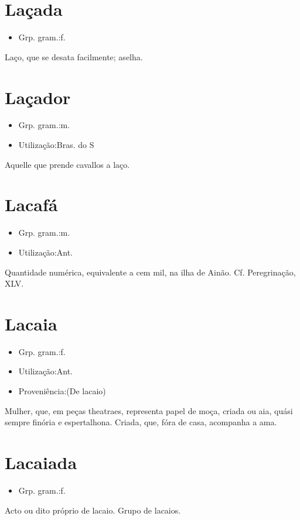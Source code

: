 \section{Laçada}
\begin{itemize}
\item {Grp. gram.:f.}
\end{itemize}
Laço, que se desata facilmente; aselha.
\section{Laçador}
\begin{itemize}
\item {Grp. gram.:m.}
\end{itemize}
\begin{itemize}
\item {Utilização:Bras. do S}
\end{itemize}
Aquelle que prende cavallos a laço.
\section{Lacafá}
\begin{itemize}
\item {Grp. gram.:m.}
\end{itemize}
\begin{itemize}
\item {Utilização:Ant.}
\end{itemize}
Quantidade numérica, equivalente a cem mil, na ilha de Ainão. Cf. \textunderscore Peregrinação\textunderscore , XLV.
\section{Lacaia}
\begin{itemize}
\item {Grp. gram.:f.}
\end{itemize}
\begin{itemize}
\item {Utilização:Ant.}
\end{itemize}
\begin{itemize}
\item {Proveniência:(De \textunderscore lacaio\textunderscore )}
\end{itemize}
Mulher, que, em peças theatraes, representa papel de moça, criada ou aia, quási sempre finória e espertalhona.
Criada, que, fóra de casa, acompanha a ama.
\section{Lacaiada}
\begin{itemize}
\item {Grp. gram.:f.}
\end{itemize}
Acto ou dito próprio de lacaio.
Grupo de lacaios.

